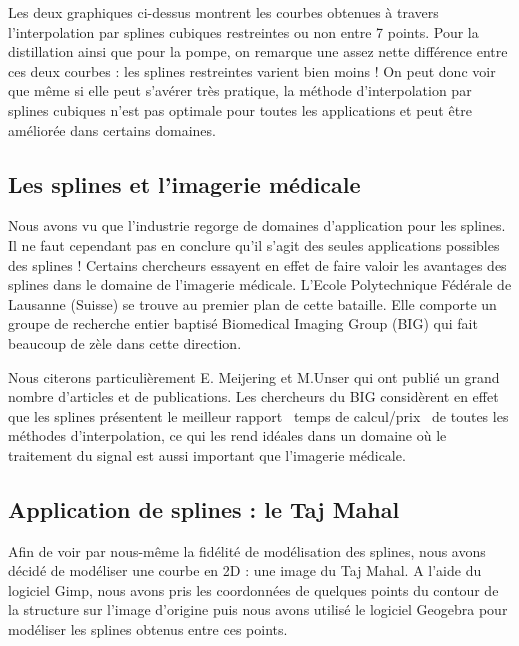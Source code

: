 \documentclass{article}
\begin{document}
Les deux graphiques ci-dessus montrent les courbes obtenues \`a travers l'interpolation par splines cubiques restreintes ou non entre 7 points. Pour la distillation ainsi que pour la pompe, on remarque une assez nette diff\'{e}rence entre ces deux courbes : les splines restreintes varient bien moins ! On peut donc voir que m\^{e}me si elle peut s'av\'{e}rer tr\`{e}s pratique, la m\'{e}thode d'interpolation par splines cubiques n'est pas optimale pour toutes les applications et peut \^{e}tre am\'{e}lior\'{e}e dans certains domaines.

\newpage
\begin{huge}
\subsection{Les splines et l'imagerie m\'edicale}
\end{huge}

Nous avons vu que l'industrie regorge de domaines d'application pour les splines. Il ne faut cependant pas en conclure qu'il s'agit des seules applications possibles des splines ! Certains chercheurs essayent en effet de faire valoir les avantages des splines dans le domaine de l'imagerie m\'{e}dicale. L'Ecole Polytechnique F\'{e}d\'{e}rale de Lausanne (Suisse) se trouve au premier plan de cette bataille. Elle comporte un groupe de recherche entier baptis\'{e} Biomedical Imaging Group (BIG) qui fait beaucoup de z\`{e}le dans cette direction.

Nous citerons particuli\`erement E. Meijering et M.Unser qui ont publi\'{e} un grand nombre d'articles et de publications. Les chercheurs du BIG consid\`{e}rent en effet que les splines pr\'{e}sentent le meilleur rapport \guillemotleft \ temps de calcul/prix \guillemotright \ de toutes les m\'{e}thodes d'interpolation, ce qui les rend id\'{e}ales dans un domaine o\`u le traitement du signal est aussi important que l'imagerie m\'{e}dicale.

\newpage
\begin{huge}
\subsection{Application de splines : le Taj Mahal}
\end{huge}

Afin de voir par nous-m\^{e}me la fid\'{e}lit\'{e} de mod\'{e}lisation des splines, nous avons d\'{e}cid\'{e} de mod\'{e}liser une courbe en 2D : une image du Taj Mahal. A l'aide du logiciel Gimp, nous avons pris les coordonn\'{e}es de quelques points du contour de la structure sur l'image d'origine puis nous avons utilis\'{e} le logiciel Geogebra pour mod\'{e}liser les splines obtenus entre ces points.
\end{document}
